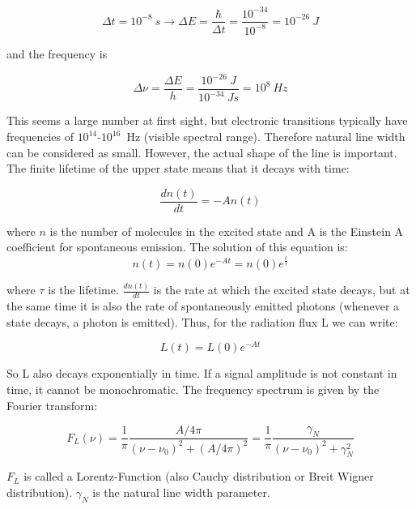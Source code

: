 \begin{equation}
\Delta t = 10^{-8}~s \rightarrow \Delta E = \frac{\hbar}{\Delta t} = \frac{10^{-34}}{10^{-8}} = 10^{-26}~J
\end{equation}

and the frequency is

\begin{equation}
\Delta \nu = \frac{\Delta E}{h} = \frac{10^{-26}~J}{10^{-34}~Js} = 10^{8}~Hz
\end{equation}

This seems a large number at first sight, but electronic transitions typically have frequencies of $10^{14}$-$10^{16}$~Hz (visible spectral range). 
Therefore natural line width can be considered as small. However, the actual shape of the line is important.  \\

The finite lifetime of the upper state means that it decays with time:
 
\begin{equation}
\frac{dn(t)}{dt} = -A n(t)
\end{equation}

where $n$ is the number of molecules in the excited state and A is the Einstein A coefficient for spontaneous emission. The solution of this equation is:
\begin{equation}
n(t) = n(0) e^{-At} = n(0) e^{\frac{t}{\tau}}
\end{equation}

where $\tau$ is the lifetime. $\frac{dn(t)}{dt}$ is the rate at which the excited state decays, but at the same time it is also the rate of spontaneously emitted photons (whenever a state decays, a photon is emitted). Thus, for the radiation flux L we can write: 

\begin{equation}
L(t) = L(0) e^{-At} 
\end{equation}

So L also decays exponentially in time. If a signal amplitude is not constant in time, it cannot be monochromatic. The frequency spectrum is given by the Fourier transform: 

\begin{equation}
F_{L}(\nu) = \frac{1}{\pi} \frac{A/4\pi}{(\nu - \nu_{0})^{2} + (A/4\pi)^{2}} = \frac{1}{\pi} \frac{\gamma_{N}}{(\nu - \nu_{0})^{2} + \gamma_{N}^{2}} 
\end{equation}

$F_{L}$ is called a Lorentz-Function (also Cauchy distribution or Breit Wigner distribution). $\gamma_{N}$ is the natural line width parameter. 

